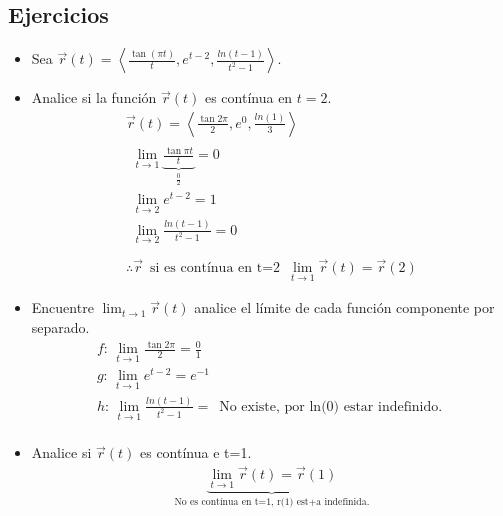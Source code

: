 \documentclass{article}
\begin{document}
\subsection{Ejercicios}
\begin{itemize}
    \item Sea $\vec{r}(t)=\left\langle \frac{\tan(\pi t)}{t} , e^{t-2}, \frac{ln(t-1)}{t^2-1}  \right\rangle $.
    \item Analice si la función $\vec{r}(t)$ es contínua en $t=2$.
        \begin{align*}
            \vec{r}(t) = \left\langle \frac{\tan 2\pi }{2}, e^0, \frac{ln(1)}{3}   \right\rangle \\ 
            \begin{matrix}
                \lim_{t \to 1} \underbrace{\frac{\tan \pi t}{t}}_{\frac{0}{2} } = 0 \\
                \lim_{t \to 2} e^{t-2} = 1 \\ 
                \lim_{t \to 2} \frac{ln(t-1)}{t^2-1} = 0 \\ 
            \end{matrix} \\ 
            \therefore \vec{r} \, \text{ si es contínua en t=2   } \, \lim_{t \to 1} \vec{r}(t) = \vec{r}(2)
        \end{align*}
    
    \item Encuentre $\lim_{t \to 1} \vec{r}(t)$ analice el límite de cada función componente por separado.
        \begin{align*}
            f: \, \lim_{t \to 1} \frac{\tan 2\pi }{2} = \frac{0}{1}  \\ 
            g: \, \lim_{t \to 1} e^{t-2} = e^{-1} \\ 
            h: \, \lim_{t \to 1} \frac{ln(t-1)}{t^2-1} = \, \text{  No existe, por ln(0) estar indefinido.  } \\ 
        \end{align*}
    
    \item Analice si $\vec{r}(t)$ es contínua e t=1.
        \begin{align*}
            \underbrace{\lim_{t \to 1} \vec{r}(t) = \vec{r}(1) }_{\text{  No es contínua en t=1, r(1) est+a indefinida.  }}\\ 
        \end{align*}
    

\end{itemize}
\end{document}

